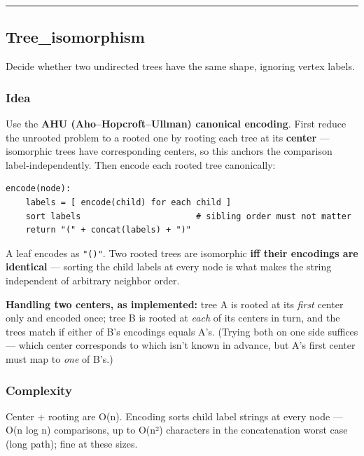 \documentclass[
  10pt,
  letterpaper,
  onecolumn]{article}
\begin{document}
\begin{center}\rule{0.5\linewidth}{0.5pt}\end{center}

\hypertarget{tree_isomorphism}{%
\subsection{Tree\_isomorphism}\label{tree_isomorphism}}

Decide whether two undirected trees have the same shape, ignoring vertex
labels.

\hypertarget{idea-12}{%
\subsubsection{Idea}\label{idea-12}}

Use the \textbf{AHU (Aho--Hopcroft--Ullman) canonical encoding}. First
reduce the unrooted problem to a rooted one by rooting each tree at its
\textbf{center} --- isomorphic trees have corresponding centers, so this
anchors the comparison label-independently. Then encode each rooted tree
canonically:

\begin{verbatim}
encode(node):
    labels = [ encode(child) for each child ]
    sort labels                       # sibling order must not matter
    return "(" + concat(labels) + ")"
\end{verbatim}

A leaf encodes as \texttt{"()"}. Two rooted trees are isomorphic
\textbf{iff their encodings are identical} --- sorting the child labels
at every node is what makes the string independent of arbitrary neighbor
order.

\textbf{Handling two centers, as implemented:} tree A is rooted at its
\emph{first} center only and encoded once; tree B is rooted at
\emph{each} of its centers in turn, and the trees match if either of B's
encodings equals A's. (Trying both on one side suffices --- which center
corresponds to which isn't known in advance, but A's first center must
map to \emph{one} of B's.)

\hypertarget{complexity-12}{%
\subsubsection{Complexity}\label{complexity-12}}

Center + rooting are O(n). Encoding sorts child label strings at every
node --- O(n log n) comparisons, up to O(n²) characters in the
concatenation worst case (long path); fine at these sizes.
\end{document}
